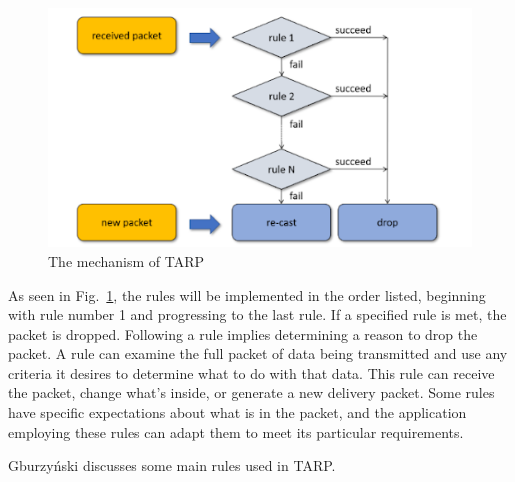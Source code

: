 \begin{figure}[htbp]
    \centerline{\includegraphics[height=0.45\textwidth]{imgs/tarpproc.png}}
    \caption{The mechanism of TARP \cite{wsn2021}}
    \label{tarpproc}
\end{figure}

As seen in Fig.~\ref{tarpproc}, the rules will be implemented in the order
listed, beginning with rule number 1 and progressing to the last rule. If a
specified rule is met, the packet is dropped. Following a rule implies
determining a reason to drop the packet. A rule can examine the full packet of
data being transmitted and use any criteria it desires to determine what to do
with that data. This rule can receive the packet, change what's inside, or
generate a new delivery packet. Some rules have specific expectations about
what is in the packet, and the application employing these rules can adapt them
to meet its particular requirements\cite{wsn2021}.

Gburzyński\cite{wsn2021} discusses some main rules used in TARP.

